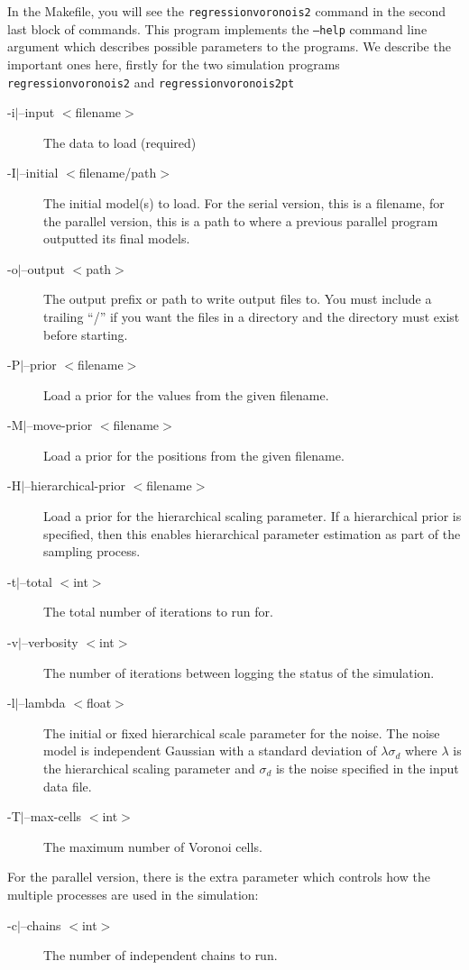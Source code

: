 \documentclass{article}
\begin{document}
In the Makefile, you will see the {\tt regressionvoronois2} command in the second
last block of commands. This program implements the {\tt --help} command line argument
which describes possible parameters to the programs. We describe the
important ones here, firstly for the two simulation programs {\tt regressionvoronois2}
and {\tt regressionvoronois2pt}

\begin{description}
\item [-i$|$--input $<$filename$>$] The data to load (required)
\item [-I$|$--initial $<$filename/path$>$] The initial model(s) to load. For the serial version,
  this is a filename, for the parallel version, this is a path to where a previous parallel
  program outputted its final models.
\item [-o$|$--output $<$path$>$] The output prefix or path to write output files to. You must include
  a trailing ``/'' if you want the files in a directory and the directory must exist before starting.
\item [-P$|$--prior $<$filename$>$] Load a prior for the values from the given filename.
\item [-M$|$--move-prior $<$filename$>$] Load a prior for the positions from the given filename.
\item [-H$|$--hierarchical-prior $<$filename$>$] Load a prior for the hierarchical scaling parameter. If a
  hierarchical prior is specified, then this enables hierarchical parameter estimation as part of the
  sampling process.
\item [-t$|$--total $<$int$>$] The total number of iterations to run for.
\item [-v$|$--verbosity $<$int$>$] The number of iterations between logging the status of the simulation.
\item [-l$|$--lambda $<$float$>$] The initial or fixed hierarchical scale parameter for the noise. The noise
  model is independent Gaussian with a standard deviation of $\lambda \sigma_d$ where $\lambda$ is
  the hierarchical scaling parameter and $\sigma_d$ is the noise specified in the input data file.
\item [-T$|$--max-cells $<$int$>$] The maximum number of Voronoi cells.
\end{description}

For the parallel version, there is the extra parameter which controls how the multiple
processes are used in the simulation:

\begin{description}
\item [-c$|$--chains $<$int$>$] The number of independent chains to run.
\end{description}
\end{document}
